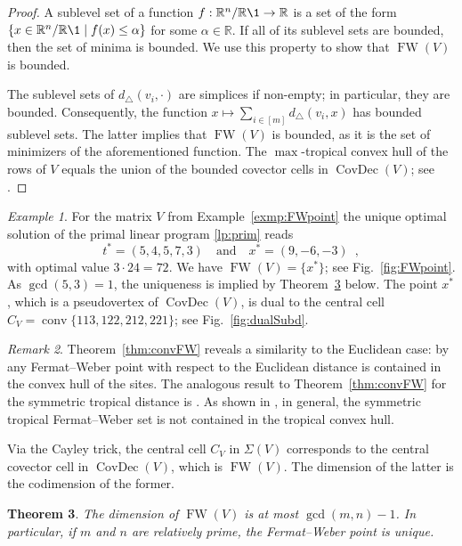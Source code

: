 \documentclass[a4paper,12pt]{amsart}
\newcommand\RR{{\mathbb R}}
\newcommand\SetOf[2]{\left\{#1 \mid #2\right\}}
\newcommand\torus[1]{\RR^{#1}/\RR\1} %
\DeclareMathOperator\conv{conv}
\DeclareMathOperator{\FW}{FW} %
\DeclareMathOperator\CovDec{CovDec} %
\newtheorem{theorem}{Theorem}
\theoremstyle{remark}
\newtheorem{example}[theorem]{Example}
\newtheorem{remark}[theorem]{Remark}
\begin{document}
\begin{proof}
  A sublevel set of a function $f:\torus{n}\to\RR$ is a set of the form $\SetOf{x\in\torus{n}}{f(x)\leq\alpha}$ for some $\alpha\in\RR$.
  If all of its sublevel sets are bounded, then the set of minima is bounded.
  We use this property to show that $\FW(V)$ is bounded.
  
  The sublevel sets of $d_{\triangle}(v_i,\cdot)$ are simplices if non-empty; in particular, they are bounded.
  Consequently, the function $x\mapsto\sum_{i\in[m]}d_{\triangle}(v_i,x)$ has bounded sublevel sets.
  The latter implies that $\FW(V)$ is bounded, as it is the set of minimizers of the aforementioned function.
  The $\max$-tropical convex hull of the rows of $V$ equals the union of the bounded covector cells in $\CovDec(V)$; see \cite[Corollary 6.17]{ETC}.
\end{proof}

\begin{example}\label{exmp:FW-prim}
  For the matrix $V$ from Example~\ref{exmp:FWpoint} the unique optimal solution of the primal linear program \eqref{lp:prim} reads
  \[
    t^*=(5,4,5,7,3) \quad \text{and} \quad x^*=(9,-6,-3) \enspace ,
  \]
  with optimal value $3 \cdot 24=72$.
  We have $\FW(V)=\{x^*\}$; see Fig.~\ref{fig:FWpoint}.
  As $\gcd(5,3)=1$, the uniqueness is implied by Theorem~\ref{thm:dimFW} below.
  The point $x^*$, which is a pseudovertex of $\CovDec(V)$, is dual to the central cell $C_V=\conv\{113,122,212,221\}$; see Fig.~\ref{fig:dualSubd}.
\end{example}

\begin{remark}
  Theorem~\ref{thm:convFW} reveals a similarity to the Euclidean case:
  by \cite[Proposition~19.1]{BMS:1999} any Fermat--Weber point with respect to the Euclidean distance is contained in the convex hull of the sites.
  The analogous result to Theorem~\ref{thm:convFW} for the symmetric tropical distance is \cite[Proposition 26]{ConvTreeSp}.
  As shown in \cite[Example 27]{ConvTreeSp}, in general, the symmetric tropical Fermat--Weber set is not contained in the tropical convex hull.
\end{remark}

Via the Cayley trick, the central cell $C_V$ in $\Sigma(V)$ corresponds to the central covector cell in $\CovDec(V)$, which is $\FW(V)$.
The dimension of the latter is the codimension of the former.

\begin{theorem} \label{thm:dimFW}
  The dimension of $\FW(V)$ is at most $\gcd(m,n)-1$.
  In particular, if $m$ and $n$ are relatively prime, the Fermat--Weber point is unique.
\end{theorem}
\end{document}
